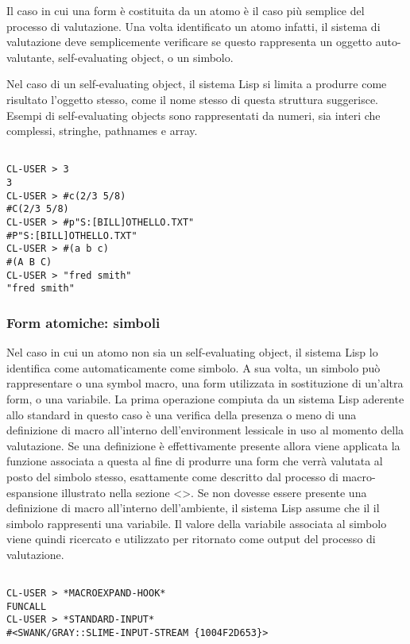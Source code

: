 Il caso in cui una form è costituita da un atomo è il caso più semplice del
processo di valutazione. Una volta identificato un atomo infatti, il sistema
di valutazione deve semplicemente verificare se questo rappresenta un oggetto
auto-valutante, self-evaluating object, o un simbolo.

Nel caso di un self-evaluating object, il sistema Lisp si limita a produrre
come risultato l’oggetto stesso, come il nome stesso di questa struttura
suggerisce. Esempi di self-evaluating objects sono rappresentati da numeri,
sia interi che complessi, stringhe, pathnames e array.

\begin{lstlisting}[caption=Esempi di form di tipo self-evaluating object]

CL-USER > 3
3
CL-USER > #c(2/3 5/8)
#C(2/3 5/8)
CL-USER > #p"S:[BILL]OTHELLO.TXT"
#P"S:[BILL]OTHELLO.TXT"
CL-USER > #(a b c)
#(A B C)
CL-USER > "fred smith"
"fred smith"

\end{lstlisting}

\subsubsection{Form atomiche: simboli}

Nel caso in cui un atomo non sia un self-evaluating object, il sistema Lisp lo
identifica come automaticamente come simbolo. A sua volta, un simbolo può
rappresentare o una symbol macro, una form utilizzata in sostituzione di
un’altra form, o una variabile. La prima operazione compiuta da un sistema
Lisp aderente allo standard in questo caso è una verifica della presenza o
meno di una definizione di macro all’interno dell’environment lessicale in uso
al momento della valutazione. Se una definizione è effettivamente presente
allora viene applicata la funzione associata a questa al fine di produrre una
form che verrà valutata al posto del simbolo stesso, esattamente come
descritto dal processo di macro-espansione illustrato nella sezione <>. Se non
dovesse essere presente una definizione di macro all’interno dell’ambiente, il
sistema Lisp assume che il il simbolo rappresenti una variabile. Il valore
della variabile associata al simbolo viene quindi ricercato e utilizzato per
ritornato come output del processo di valutazione.\\

\begin{lstlisting}[caption=Esempi di form di tipo symbol]

CL-USER > *MACROEXPAND-HOOK*
FUNCALL
CL-USER > *STANDARD-INPUT*
#<SWANK/GRAY::SLIME-INPUT-STREAM {1004F2D653}>

\end{lstlisting}

